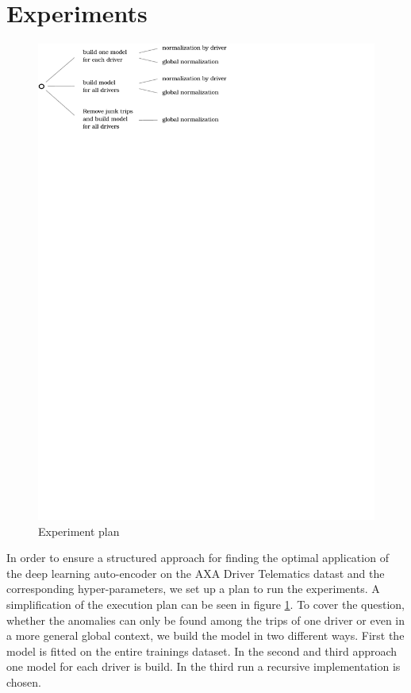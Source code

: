 \documentclass{vldb}
\begin{document}
\section{Experiments}
\label{sec:Experiments}

\begin{figure}
\centering
\includegraphics[trim=0cm 24.2cm 9.2cm 0cm, clip=true, width=\linewidth]{"pics/experiment-plan"}
\caption{Experiment plan}
\label{fig:Exp-plan}
\end{figure}

In order to ensure a structured approach for finding the optimal application of the deep learning auto-encoder on the AXA Driver Telematics datast and the corresponding hyper-parameters, we set up a plan to run the experiments. A simplification of the execution plan can be seen in figure \ref{fig:Exp-plan}. To cover the question, whether the anomalies can only be found among the trips of one driver or even in a more general global context, we build the model in two different ways. First the model is fitted on the entire trainings dataset. In the second and third approach one model for each driver is build. In the third run a recursive implementation is chosen.
\end{document}
